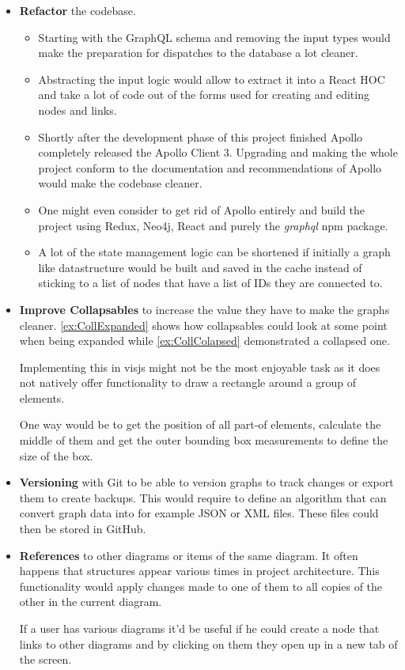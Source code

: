 \begin{itemize}
\item \textbf{Refactor} the codebase.
\begin{itemize}
\item Starting with the GraphQL schema and removing the input types would make the preparation for dispatches to the database a lot cleaner. 
\item Abstracting the input logic would allow to extract it into a React HOC and take a lot of code out of the forms used for creating and editing nodes and links.
\item Shortly after the development phase of this project finished Apollo completely released the Apollo Client 3. Upgrading and making the whole project conform to the documentation and recommendations of Apollo would make the codebase cleaner.
\item One might even consider to get rid of Apollo entirely and build the project using Redux, Neo4j, React and purely the \emph{graphql} npm package.
\item A lot of the state management logic can be shortened if initially a graph like datastructure would be built and saved in the cache instead of sticking to a list of nodes that have a list of IDs they are connected to.
\end{itemize}

\item \textbf{Improve Collapsables} to increase the value they have to make the graphs cleaner. \autoref{ex:CollExpanded} shows how collapsables could look at some point when being expanded while \autoref{ex:CollColapsed} demonstrated a collapsed one.

Implementing this in visjs might not be the most enjoyable task as it does not natively offer functionality to draw a rectangle around a group of elements.

One way would be to get the position of all part-of elements, calculate the middle of them and get the outer bounding box measurements to define the size of the box. 

\item \textbf{Versioning} with Git to be able to version graphs to track changes or export them to create backups. This would require to define an algorithm that can convert graph data into for example JSON or XML files. These files could then be stored in GitHub. 

\item \textbf{References} to other diagrams or items of the same diagram. 
It often happens that structures appear various times in project architecture. This functionality would apply changes made to one of them to all copies of the other in the current diagram.

If a user has various diagrams it'd be useful if he could create a node that links to other diagrams and by clicking on them they open up in a new tab of the screen. 
\end{itemize}

